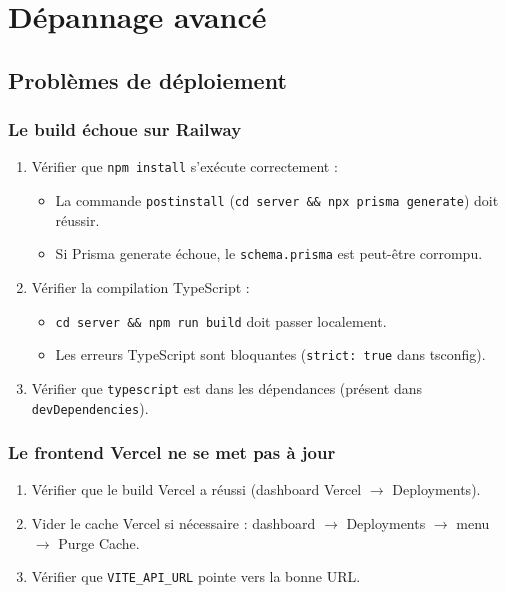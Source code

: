 \documentclass[12pt,a4paper]{report}
\begin{document}
\chapter{Dépannage avancé}

\section{Problèmes de déploiement}

\subsection{Le build échoue sur Railway}
\begin{enumerate}
    \item Vérifier que \texttt{npm install} s'exécute correctement :
    \begin{itemize}
        \item La commande \texttt{postinstall} (\texttt{cd server \&\& npx prisma generate}) doit réussir.
        \item Si Prisma generate échoue, le \texttt{schema.prisma} est peut-être corrompu.
    \end{itemize}
    \item Vérifier la compilation TypeScript :
    \begin{itemize}
        \item \texttt{cd server \&\& npm run build} doit passer localement.
        \item Les erreurs TypeScript sont bloquantes (\texttt{strict: true} dans tsconfig).
    \end{itemize}
    \item Vérifier que \texttt{typescript} est dans les dépendances (présent dans \texttt{devDependencies}).
\end{enumerate}

\subsection{Le frontend Vercel ne se met pas à jour}
\begin{enumerate}
    \item Vérifier que le build Vercel a réussi (dashboard Vercel $\rightarrow$ Deployments).
    \item Vider le cache Vercel si nécessaire : dashboard $\rightarrow$ Deployments $\rightarrow$ menu $\rightarrow$ Purge Cache.
    \item Vérifier que \texttt{VITE\_API\_URL} pointe vers la bonne URL.
\end{enumerate}
\end{document}
